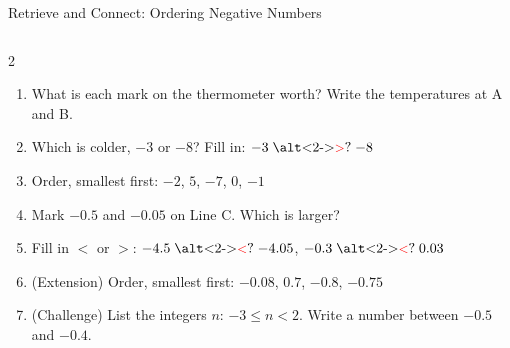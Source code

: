 \documentclass{beamer}
\newcommand{\ashow}[1]{\uncover<2->{\textcolor{red}{\small #1}}}
\newcommand{\ashowq}[1]{\alt<2->{\textcolor{red}{\small #1}}{?}}
\begin{document}
\begin{frame}{Retrieve and Connect: Ordering Negative Numbers}
\begin{columns}[T]
\begin{multicols}{2}
\begin{enumerate}
  \item What is each mark on the thermometer worth? Write the temperatures at A and B. \ashow{$2\,^\circ$C per mark; A $=-6$, B $=4$}

  \item Which is colder, $-3$ or $-8$? Fill in: $-3 \mathrel{\text{\ashowq{$>$}}} -8$ \ashow{($-8$ is colder)}

  \item Order, smallest first: $-2$, $5$, $-7$, $0$, $-1$ \ashow{($-7,-2,-1,0,5$)}

  \columnbreak

  \item Mark $-0.5$ and $-0.05$ on Line C. Which is larger? \ashow{$-0.05$}

  \item Fill in $<$ or $>$: $-4.5 \mathrel{\text{\ashowq{$<$}}} -4.05$, $-0.3 \mathrel{\text{\ashowq{$<$}}} 0.03$

  \item (Extension) Order, smallest first: $-0.08$, $0.7$, $-0.8$, $-0.75$ \ashow{($-0.8$, $-0.75$, $-0.08$, $0.7$)}

  \item (Challenge) List the integers $n$: $-3\leq n<2$. Write a number between $-0.5$ and $-0.4$. \ashow{$-3,-2,-1,0,1$; e.g.\ $-0.45$}

\end{enumerate}
\end{multicols}

\end{columns}

\end{frame}
\end{document}
